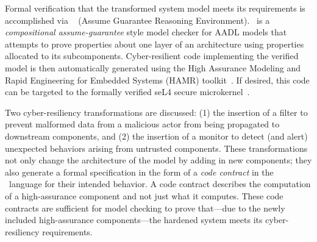 Formal
verification that the transformed system model meets its requirements
is accomplished via \agr~\cite{agree2013} (Assume Guarantee Reasoning
Environment).
\agr\ is a {\em compositional assume-guarantee} style model checker
for AADL models that attempts to prove properties about one layer of
an architecture using properties allocated to its subcomponents.
Cyber-resilient code implementing the verified model is then
automatically generated using the High Assurance Modeling and Rapid
Engineering for Embedded Systems (HAMR) toolkit~\cite{hamr}.  If
desired, this code can be targeted to the formally verified seL4
secure microkernel~\cite{sel4-2009}.


Two cyber-resiliency transformations are discussed: (1) the insertion
of a filter to prevent malformed data from a malicious actor from
being propagated to downstream components, and (2) the insertion of a
monitor to detect (and alert) unexpected behaviors arising from
untrusted components. These transformations not only change the
architecture of the model by adding in new components; they also
generate a formal specification in the form of a \emph{code contract} in the \agr\ language for their intended behavior. 
A code contract describes the computation of a high-assurance component and not just what it computes.
These code contracts
are sufficient for model checking to prove that---due to the newly
included high-assurance components---the hardened system meets its
cyber-resiliency requirements.


